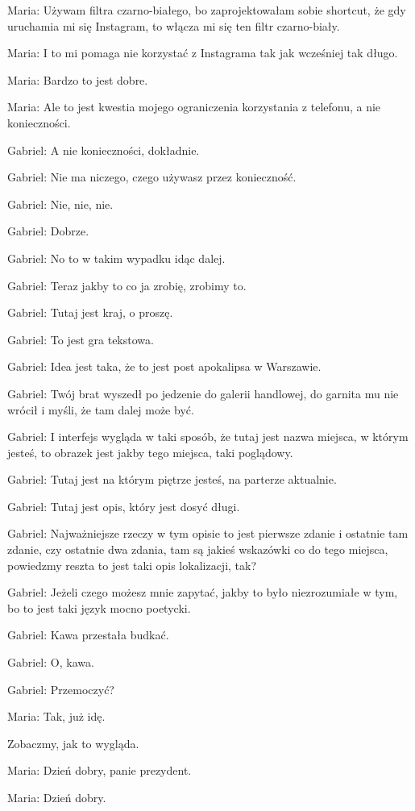 Maria: Używam filtra czarno-białego, bo zaprojektowałam sobie shortcut, że gdy uruchamia mi się Instagram, to włącza mi się ten filtr czarno-biały.

Maria: I to mi pomaga nie korzystać z Instagrama tak jak wcześniej tak długo.

Maria: Bardzo to jest dobre.

Maria: Ale to jest kwestia mojego ograniczenia korzystania z telefonu, a nie konieczności.

Gabriel: A nie konieczności, dokładnie.

Gabriel: Nie ma niczego, czego używasz przez konieczność.

Gabriel: Nie, nie, nie.

Gabriel: Dobrze.

Gabriel: No to w takim wypadku idąc dalej.

Gabriel: Teraz jakby to co ja zrobię, zrobimy to.

Gabriel: Tutaj jest kraj, o proszę.

Gabriel: To jest gra tekstowa.

Gabriel: Idea jest taka, że to jest post apokalipsa w Warszawie.

Gabriel: Twój brat wyszedł po jedzenie do galerii handlowej, do garnita mu nie wrócił i myśli, że tam dalej może być.

Gabriel: I interfejs wygląda w taki sposób, że tutaj jest nazwa miejsca, w którym jesteś, to obrazek jest jakby tego miejsca, taki poglądowy.

Gabriel: Tutaj jest na którym piętrze jesteś, na parterze aktualnie.

Gabriel: Tutaj jest opis, który jest dosyć długi.

Gabriel: Najważniejsze rzeczy w tym opisie to jest pierwsze zdanie i ostatnie tam zdanie, czy ostatnie dwa zdania, tam są jakieś wskazówki co do tego miejsca, powiedzmy reszta to jest taki opis lokalizacji, tak?

Gabriel: Jeżeli czego możesz mnie zapytać, jakby to było niezrozumiałe w tym, bo to jest taki język mocno poetycki.

Gabriel: Kawa przestała budkać.

Gabriel: O, kawa.

Gabriel: Przemoczyć?

Maria: Tak, już idę.

Zobaczmy, jak to wygląda.

Maria: Dzień dobry, panie prezydent.

Maria: Dzień dobry.

